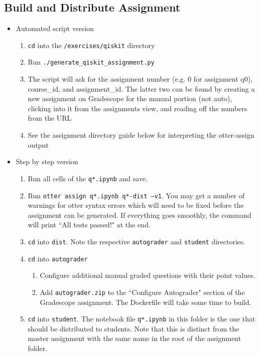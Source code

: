 \documentclass[12pt]{article}
\begin{document}
\subsection*{Build and Distribute Assignment}
\begin{itemize}
    \item Automated script version
    \begin{enumerate}[font=\bfseries]
        \item \texttt{cd} into the \texttt{/exercises/qiskit} directory
        \item Run \texttt{./generate\_qiskit\_assignment.py}
        \item The script will ask for the assignment number (e.g. 0 for assignment q0), course\_id, and assignment\_id. The latter two can be found by creating a new assignment on Gradescope for the manual portion (not auto), clicking into it from the assignments view, and reading off the numbers from the URL
        \item See the assignment directory guide below for interpreting the otter-assign output
    \end{enumerate}
    \item Step by step version
    \begin{enumerate}[font=\bfseries]
        \item Run all cells of the \texttt{q*.ipynb} and save.
        \item Run \texttt{otter assign q*.ipynb q*-dist --v1}. You may get a number of warnings for otter syntax errors which will need to be fixed before the assignment can be generated. If everything goes smoothly, the command will print ``All tests passed!" at the end.
        \item \texttt{cd} into \texttt{dist}. Note the respective \texttt{autograder} and \texttt{student} directories.
        \item \texttt{cd} into \texttt{autograder}
        \begin{enumerate}
            \item Configure additional manual graded questions with their point values.
            \item Add \texttt{autograder.zip} to the ``Configure Autograder" section of the Gradescope assignment. The Dockerfile will take some time to build.
        \end{enumerate}
        \item \texttt{cd} into \texttt{student}. The notebook file \texttt{q*.ipynb} in this folder is the one that should be distributed to students. Note that this is distinct from the master assignment with the same name in the root of the assignment folder.
    \end{enumerate}
\end{itemize}
\end{document}
